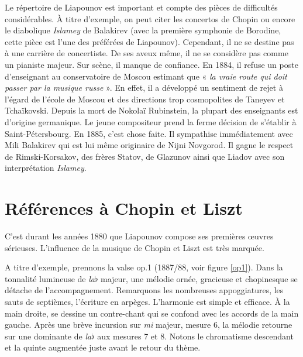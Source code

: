 \noindent Le répertoire de Liapounov est important et compte des pièces de difficultés considérables. À titre d'exemple, on peut citer les concertos de Chopin ou encore le diabolique \emph{Islamey} de Balakirev (avec la première symphonie de Borodine, cette pièce est l'une des préférées de Liapounov). Cependant, il ne se destine pas à une carrière de concertiste. De ses aveux même, il ne se considère pas comme un pianiste majeur. Sur scène, il manque de confiance. En 1884, il refuse un poste d'enseignant au conservatoire de Moscou estimant que « \emph{la vraie route qui doit passer par la musique russe} ». En effet, il a développé un sentiment de rejet à l'égard de l'école de Moscou et des directions trop cosmopolites de Taneyev et Tchaïkovski. Depuis la mort de Nokolaï Rubinstein, la plupart des enseignants est d'origine germanique. Le jeune compositeur prend la ferme décision de s'établir à Saint-Pétersbourg. En 1885, c'est chose faite. Il sympathise immédiatement avec Mili Balakirev qui est lui même originaire de Nijni Novgorod. Il gagne le respect de Rimski-Korsakov, des frères Statov, de Glazunov ainsi que Liadov avec son interprétation \emph{Islamey}.

\section{Références à Chopin et Liszt}

C'est durant les années 1880 que Liapounov compose ses premières œuvres sérieuses. L'influence de la musique de Chopin et Liszt est très marquée.

A titre d'exemple, prennons la valse op.1 (1887/88, voir figure \ref{op1}). Dans la tonnalité lumineuse de \emph{la}$\flat$ majeur, une mélodie ornée, gracieuse et chopinesque se détache de l'accompagnement. Remarquons les nombreuses appoggiatures, les sauts de septièmes, l'écriture en arpèges. L'harmonie est simple et efficace. À la main droite, se dessine un contre-chant qui se confond avec les accords de la main gauche. Après une brève incursion sur \emph{mi} majeur, mesure 6, la mélodie retourne sur une dominante de \emph{la}$\flat$ aux mesures 7 et 8. Notons le chromatisme descendant et la quinte augmentée juste avant le retour du thème.

